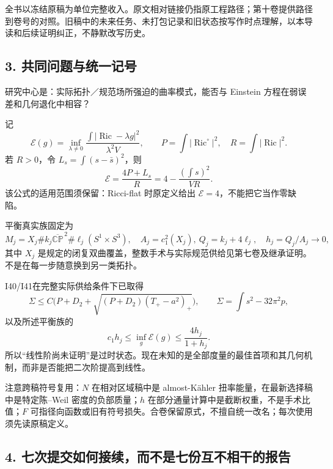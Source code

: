 \documentclass[
  10pt,
]{article}
\begin{document}
全书以冻结原稿为单位完整收入。原文相对链接仍指原工程路径；第十卷提供路径到卷号的对照。旧稿中的未来任务、未打包记录和旧状态按写作时点理解，以本导读和后续证明纠正，不静默改写历史。

\hypertarget{ux5171ux540cux95eeux9898ux4e0eux7edfux4e00ux8bb0ux53f7}{%
\subsection{3.
共同问题与统一记号}\label{ux5171ux540cux95eeux9898ux4e0eux7edfux4e00ux8bb0ux53f7}}

研究中心是：实际拓扑／规范场所强迫的曲率模式，能否与 Einstein
方程在弱误差和几何退化中相容？

记 \[
\mathcal E(g)=\inf_{\lambda\ne0}
\frac{\int|\operatorname{Ric}-\lambda g|^2}{\lambda^2V},\qquad
P=\int|\operatorname{Ric}^{\circ}|^2,\quad R=\int|\operatorname{Ric}|^2.
\] 若 \(R>0\)，令 \(L_s=\int(s-\bar s)^2\)，则 \[
\mathcal E=\frac{4P+L_s}{R}
=4-\frac{(\int s)^2}{VR}.
\] 该公式的适用范围须保留：Ricci-flat 时原定义给出
\(\mathcal E=4\)，不能把它当作零缺陷。

平衡真实族固定为 \[
M_j=X_j\# k_j\overline{\mathbb {CP}}^{\,2}
\#\ell_j(S^1\times S^3),\quad
A_j=c_1^2(X_j),\ Q_j=k_j+4\ell_j,
\quad h_j=Q_j/A_j\longrightarrow0,
\] 其中 \(X_j\)
是规定的闭复双曲覆盖，整数手术与实际规范供给见第七卷及继承证明。不是在每一步随意换到另一类拓扑。

I40/I41在完整实际供给条件下已取得 \[
\Sigma\le C\bigl(P+D_2+\sqrt{(P+D_2)(T_+-a^2)_+}\bigr),
\qquad \Sigma=\int s^2-32\pi^2p,
\] 以及所述平衡族的 \[
c_1h_j\le\inf_g\mathcal E(g)\le\frac{4h_j}{1+h_j}.
\]
所以``线性阶尚未证明''是过时状态。现在未知的是全部度量的最佳首项和其几何机制，而非是否能把二次阶提高到线性。

注意跨稿符号复用：\(N\) 在相对区域稿中是 almost-Kähler
扭率能量，在最新选择稿中是特定陈--Weil 密度的负部质量；\(h\)
在部分通量计算中是截断权重，不是手术比值；\(F\)
可指径向函数或旧有符号损失。合卷保留原式，不擅自统一改名；每次使用须先读原稿定义。

\hypertarget{ux4e03ux6b21ux63d0ux4ea4ux5982ux4f55ux63a5ux7eedux800cux4e0dux662fux4e03ux4efdux4e92ux4e0dux76f8ux5e72ux7684ux62a5ux544a}{%
\subsection{4.
七次提交如何接续，而不是七份互不相干的报告}\label{ux4e03ux6b21ux63d0ux4ea4ux5982ux4f55ux63a5ux7eedux800cux4e0dux662fux4e03ux4efdux4e92ux4e0dux76f8ux5e72ux7684ux62a5ux544a}}
\end{document}
